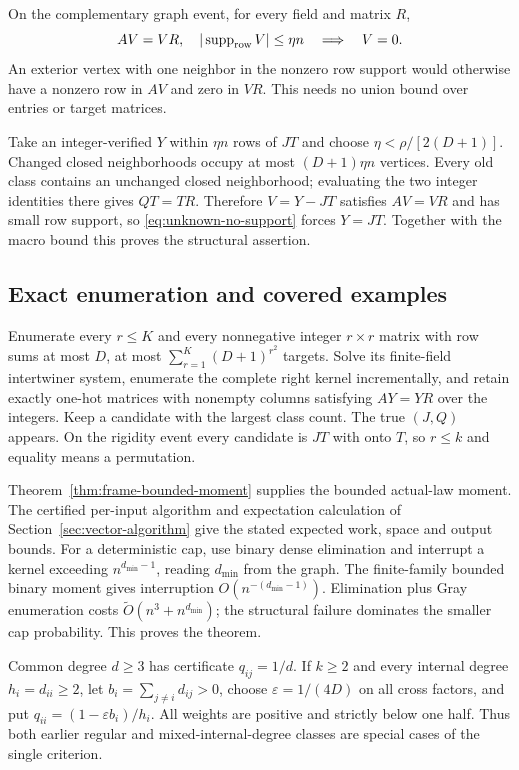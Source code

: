 On the complementary graph event, for every field and matrix $R$,
\begin{equation}\label{eq:unknown-no-support}
 AV=VR,\quad |\operatorname{supp}_{\rm row}V|\le\eta n\quad\Longrightarrow\quad V=0.
\end{equation}
An exterior vertex with one neighbor in the nonzero row support
would otherwise have a nonzero row in $AV$ and zero in $VR$.
This needs no union bound over entries or target matrices.

Take an integer-verified $Y$ within $\eta n$ rows of $JT$ and choose
$\eta<\rho/[2(D+1)]$. Changed closed neighborhoods occupy at most
$(D+1)\eta n$ vertices. Every old class contains an unchanged closed
neighborhood; evaluating the two integer identities there gives
$QT=TR$. Therefore $V=Y-JT$ satisfies $AV=VR$ and has small row
support, so \eqref{eq:unknown-no-support} forces $Y=JT$.
Together with the macro bound this proves the structural assertion.

\subsection{Exact enumeration and covered examples}
Enumerate every $r\le K$ and every nonnegative integer $r\times r$
matrix with row sums at most $D$, at most
$\sum_{r=1}^K(D+1)^{r^2}$ targets. Solve its finite-field intertwiner
system, enumerate the complete right kernel incrementally, and retain
exactly one-hot matrices with nonempty columns satisfying $AY=YR$
over the integers. Keep a candidate with the largest class count.
The true $(J,Q)$ appears. On the rigidity event every candidate is
$JT$ with onto $T$, so $r\le k$ and equality means a permutation.

Theorem~\ref{thm:frame-bounded-moment} supplies the bounded actual-law
moment. The certified per-input algorithm and expectation calculation
of Section~\ref{sec:vector-algorithm} give the stated expected work,
space and output bounds. For a deterministic cap, use binary dense
elimination and interrupt a kernel exceeding $n^{d_{\min}-1}$,
reading $d_{\min}$ from the graph. The finite-family bounded binary
moment gives interruption $O(n^{-(d_{\min}-1)})$.
Elimination plus Gray enumeration costs
$\widetilde O(n^3+n^{d_{\min}})$; the structural failure dominates
the smaller cap probability. This proves the theorem.

Common degree $d\ge3$ has certificate $q_{ij}=1/d$.
If $k\ge2$ and every internal degree $h_i=d_{ii}\ge2$, let
$b_i=\sum_{j\ne i}d_{ij}>0$, choose $\varepsilon=1/(4D)$ on all
cross factors, and put $q_{ii}=(1-\varepsilon b_i)/h_i$.
All weights are positive and strictly below one half.
Thus both earlier regular and mixed-internal-degree classes are
special cases of the single criterion.

